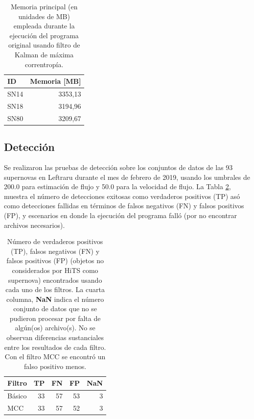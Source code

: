 \begin{table}[h!]
\centering
\caption{Memoria principal (en unidades de MB) empleada durante la ejecuci\'on del programa original usando filtro de Kalman de m\'axima correntrop\'ia.}
\begin{tabular}{|l|r|}
\hline
\textbf{ID} & Memoria [MB]\\\hline\hline
SN14 & 3353,13\\\hline
SN18 & 3194,96\\\hline
SN80 & 3209,67\\\hline
\end{tabular}
\label{tab:mem2}
\end{table}

\subsection{Detecci\'on}
Se realizaron las pruebas de detecci\'on sobre los conjuntos de datos de las 93 supernovas en Leftraru durante el mes de febrero de 2019, usando los  umbrales de 200.0 para estimaci\'on de flujo y 50.0 para la velocidad de flujo. La Tabla \ref{tab:tpfn}, muestra el n\'umero de detecciones exitosas como verdaderos positivos (TP) as\'o como detecciones fallidas en t\'erminos de falsos negativos (FN) y falsos positivos (FP), y escenarios en donde la ejecuci\'on del programa fall\'o (por no encontrar archivos necesarios). 
\bigskip

\begin{table}[h!]
\centering
\caption{N\'umero de verdaderos positivos (TP), falsos negativos (FN) y falsos positivos (FP) (objetos no considerados por HiTS como supernova) encontrados usando cada uno de los filtros. La cuarta columna, \textbf{NaN} indica el n\'umero conjunto de datos que no se pudieron procesar por falta de alg\'un(os) archivo(s). No se observan diferencias sustanciales entre los resultados de cada filtro. Con el filtro MCC se encontr\'o un falso positivo menos.}
\begin{tabular}{|l|r|r|r|r|}
\hline
\textbf{Filtro} & \textbf{TP} & \textbf{FN} & \textbf{FP}  & \textbf{NaN}\\ \hline
Básico          & 33          & 57         & 53 & 3 \\ \hline
MCC             & 33          & 57         & 52 & 3 \\ \hline
\end{tabular}
\label{tab:tpfn}
\end{table}

